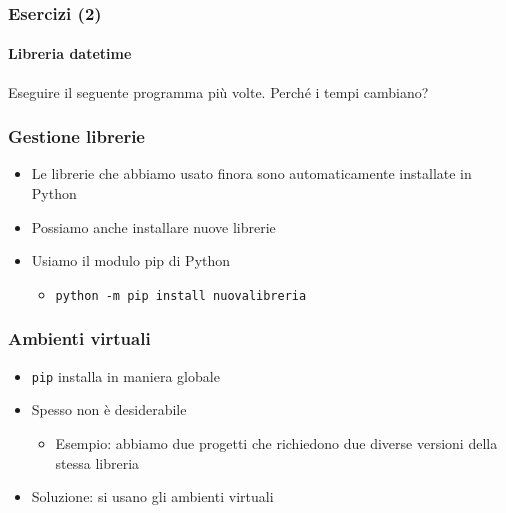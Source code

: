 \begin{exerciseframe}
    \frametitle{Esercizi (2)}
    \framesubtitle{Libreria datetime}

    Eseguire il seguente programma più volte. Perché i tempi cambiano?

    \medskip
\end{exerciseframe}


\begin{contentframe}
    \frametitle{Gestione librerie}

    \begin{itemize}
        \item Le librerie che abbiamo usato finora sono automaticamente installate in Python
        \item Possiamo anche installare nuove librerie

        \bigskip
        \item Usiamo il modulo pip di Python
        \begin{itemize}
            \item \texttt{python -m pip install nuovalibreria}
        \end{itemize}
    \end{itemize}
\end{contentframe}

\begin{contentframe}
    \frametitle{Ambienti virtuali}

    \begin{itemize}
        \item \texttt{pip} installa in maniera globale
        \item Spesso non è desiderabile
        \begin{itemize}
            \item Esempio: abbiamo due progetti che richiedono due diverse versioni della stessa libreria
        \end{itemize}

        \bigskip
        \item Soluzione: si usano gli ambienti virtuali
    \end{itemize}
\end{contentframe}

